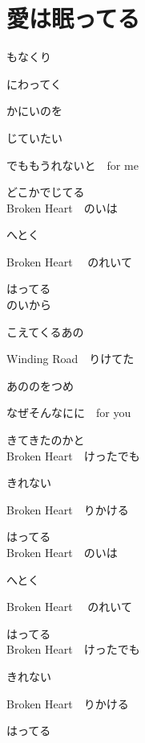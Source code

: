 \section{ 愛は眠ってる}
\large{

もなくり

にわってく

かにいのを

じていたい

でももうれないと　for me

どこかでじてる
\\

Broken Heart　のいは

へとく

Broken Heart 　のれいて

はってる
\\

のいから

こえてくるあの

Winding Road　りけてた

あののをつめ

なぜそんなにに　for you

きてきたのかと
\\

Broken Heart　けったでも

きれない

Broken Heart　りかける

はってる
\\

Broken Heart　のいは

へとく

Broken Heart 　のれいて

はってる
\\

Broken Heart　けったでも

きれない

Broken Heart　りかける

はってる

}